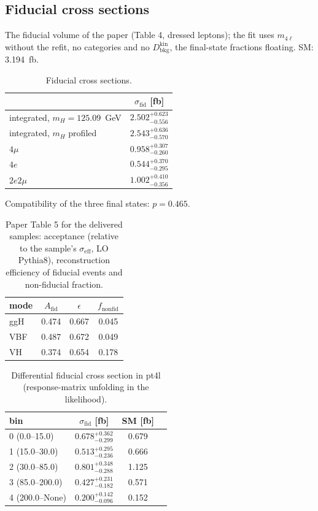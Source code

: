 \documentclass[11pt,a4paper]{article}
\begin{document}
\subsection{Fiducial cross sections}
The fiducial volume of the paper (Table 4, dressed leptons); the fit uses $m_{4\ell}$ without the refit, no categories and no $D_{\text{bkg}}^{\text{kin}}$, the final-state fractions floating.  SM: 3.194~fb.
\begin{table}[H]\centering\small\caption{Fiducial cross sections.}\begin{tabular}{lc}\toprule & $\sigma_{\text{fid}}$ [fb]\\\midrule
integrated, $m_H=125.09$~GeV & $2.502^{+0.623}_{-0.556}$\\
integrated, $m_H$ profiled & $2.543^{+0.636}_{-0.570}$\\
$4\mu$ & $0.958^{+0.307}_{-0.260}$\\
$4e$ & $0.544^{+0.370}_{-0.295}$\\
$2e2\mu$ & $1.002^{+0.410}_{-0.356}$\\
\bottomrule\end{tabular}\end{table}
Compatibility of the three final states: $p=0.465$.
\begin{table}[H]\centering\small\caption{Paper Table 5 for the delivered samples: acceptance (relative to the sample's $\sigma_{\text{eff}}$, LO Pythia8), reconstruction efficiency of fiducial events and non-fiducial fraction.}\begin{tabular}{lccc}\toprule mode & $A_{\text{fid}}$ & $\epsilon$ & $f_{\text{nonfid}}$\\\midrule
ggH & 0.474 & 0.667 & 0.045\\
VBF & 0.487 & 0.672 & 0.049\\
VH & 0.374 & 0.654 & 0.178\\
\bottomrule\end{tabular}\end{table}
\begin{table}[H]\centering\small\caption{Differential fiducial cross section in pt4l (response-matrix unfolding in the likelihood).}\begin{tabular}{lccc}\toprule bin & $\sigma_{\text{fid}}$ [fb] & SM [fb]\\\midrule
0 (0.0--15.0) & $0.678^{+0.362}_{-0.299}$ & 0.679\\
1 (15.0--30.0) & $0.513^{+0.295}_{-0.236}$ & 0.666\\
2 (30.0--85.0) & $0.801^{+0.348}_{-0.288}$ & 1.125\\
3 (85.0--200.0) & $0.427^{+0.231}_{-0.182}$ & 0.571\\
4 (200.0--None) & $0.200^{+0.142}_{-0.096}$ & 0.152\\
\bottomrule\end{tabular}\end{table}
\end{document}
